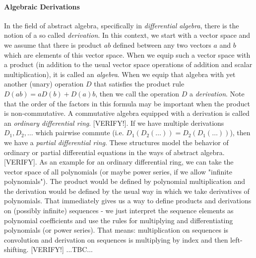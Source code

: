
\paragraph{Algebraic Derivations}
In the field of abstract algebra, specifically in \emph{differential algebra}, there is the notion of a so called \emph{derivation}. In this context, we start with a vector space and we assume that there is product $a b$ defined between any two vectors $a$ and $b$ which are elements of this vector space. When we equip such a vector space with a product (in addition to the usual vector space operations of addition and scalar multiplication), it is called an \emph{algebra}. When we equip that algebra with yet another (unary) operation $D$ that satisfies the product rule $D(a b) = a D(b) + D(a) b$, then we call the operation $D$ a \emph{derivation}. Note that the order of the factors in this formula may be important when the product is non-commutative. A commutative algebra equipped with a derivation is called an \emph{ordinary differential ring}. [VERIFY!]. If we have multiple derivations $D_1, D_2, \ldots$ which pairwise commute (i.e. $D_1(D_2(\ldots)) = D_2(D_1(\ldots))$), then we have a \emph{partial differential ring}. These structures model the behavior of ordinary or partial differential equations in the ways of abstract algebra. [VERIFY]. As an example for an ordinary differential ring, we can take the vector space of all polynomials (or maybe power series, if we allow "infinite polynomials"). The product would be defined by polynomial multiplication and the derivation would be defined by the usual way in which we take derivatives of polynomials. That immediately gives us a way to define products and derivations on (possibly infinite) sequences - we just interpret the sequence elements as polynomial coefficients and use the rules for multiplying and differentiating polynomials (or power series). That means: multiplication on sequences is convolution and derivation on sequences is multiplying by index and then left-shifting. [VERIFY!] ...TBC...


%
%

